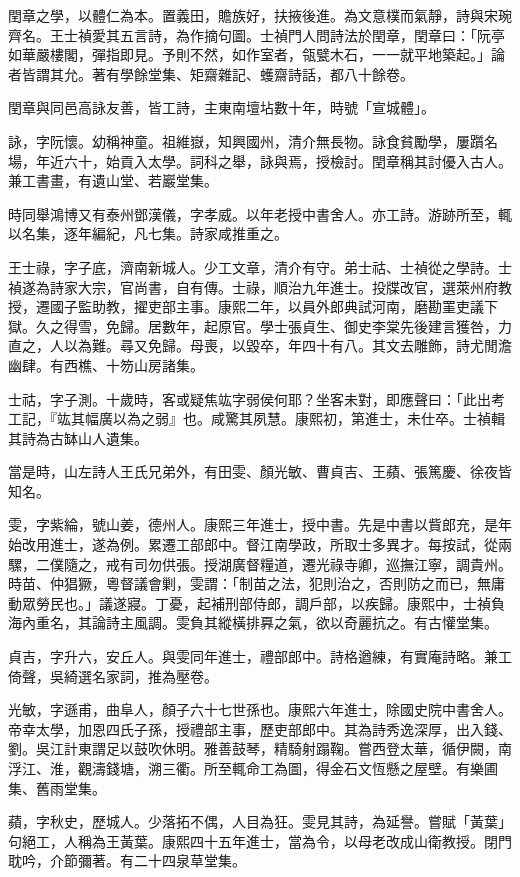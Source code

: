 \begin{pinyinscope}
閏章之學，以體仁為本。置義田，贍族好，扶掖後進。為文意樸而氣靜，詩與宋琬齊名。王士禎愛其五言詩，為作摘句圖。士禎門人問詩法於閏章，閏章曰：「阮亭如華嚴樓閣，彈指即見。予則不然，如作室者，瓴甓木石，一一就平地築起。」論者皆謂其允。著有學餘堂集、矩齋雜記、蠖齋詩話，都八十餘卷。

閏章與同邑高詠友善，皆工詩，主東南壇坫數十年，時號「宣城體」。

詠，字阮懷。幼稱神童。祖維嶽，知興國州，清介無長物。詠食貧勵學，屢躓名場，年近六十，始貢入太學。詞科之舉，詠與焉，授檢討。閏章稱其討優入古人。兼工書畫，有遺山堂、若巖堂集。

時同舉鴻博又有泰州鄧漢儀，字孝威。以年老授中書舍人。亦工詩。游跡所至，輒以名集，逐年編紀，凡七集。詩家咸推重之。

王士祿，字子底，濟南新城人。少工文章，清介有守。弟士祜、士禎從之學詩。士禎遂為詩家大宗，官尚書，自有傳。士祿，順治九年進士。投牒改官，選萊州府教授，遷國子監助教，擢吏部主事。康熙二年，以員外郎典試河南，磨勘罣吏議下獄。久之得雪，免歸。居數年，起原官。學士張貞生、御史李棠先後建言獲咎，力直之，人以為難。尋又免歸。母喪，以毀卒，年四十有八。其文去雕飾，詩尤閒澹幽肆。有西樵、十笏山房諸集。

士祜，字子測。十歲時，客或疑焦竑字弱侯何耶？坐客未對，即應聲曰：「此出考工記，『竑其幅廣以為之弱』也。咸驚其夙慧。康熙初，第進士，未仕卒。士禎輯其詩為古缽山人遺集。

當是時，山左詩人王氏兄弟外，有田雯、顏光敏、曹貞吉、王蘋、張篤慶、徐夜皆知名。

雯，字紫綸，號山姜，德州人。康熙三年進士，授中書。先是中書以貲郎充，是年始改用進士，遂為例。累遷工部郎中。督江南學政，所取士多異才。每按試，從兩騾，二僕隨之，戒有司勿供張。授湖廣督糧道，遷光祿寺卿，巡撫江寧，調貴州。時苗、仲猖獗，粵督議會剿，雯謂：「制苗之法，犯則治之，否則防之而已，無庸動眾勞民也。」議遂寢。丁憂，起補刑部侍郎，調戶部，以疾歸。康熙中，士禎負海內重名，其論詩主風調。雯負其縱橫排奡之氣，欲以奇麗抗之。有古懽堂集。

貞吉，字升六，安丘人。與雯同年進士，禮部郎中。詩格遒練，有實庵詩略。兼工倚聲，吳綺選名家詞，推為壓卷。

光敏，字遜甫，曲阜人，顏子六十七世孫也。康熙六年進士，除國史院中書舍人。帝幸太學，加恩四氏子孫，授禮部主事，歷吏部郎中。其為詩秀逸深厚，出入錢、劉。吳江計東謂足以鼓吹休明。雅善鼓琴，精騎射蹋鞠。嘗西登太華，循伊闕，南浮江、淮，觀濤錢塘，溯三衢。所至輒命工為圖，得金石文恆懸之屋壁。有樂圃集、舊雨堂集。

蘋，字秋史，歷城人。少落拓不偶，人目為狂。雯見其詩，為延譽。嘗賦「黃葉」句絕工，人稱為王黃葉。康熙四十五年進士，當為令，以母老改成山衛教授。閉門耽吟，介節彌著。有二十四泉草堂集。


\end{pinyinscope}
